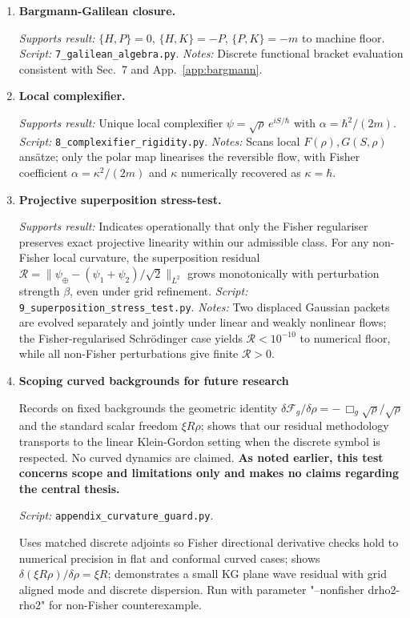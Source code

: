 \documentclass[11pt,a4paper]{article}
\numberwithin{equation}{section}
\theoremstyle{thmcompact}
\theoremstyle{remark}
\begin{document}
\begin{enumerate}[leftmargin=1.25em,label=\textbf{Test~\arabic*:},itemsep=1em]
		\item \textbf{Bargmann-Galilean closure.}
		
		\emph{Supports result:} $\{H,P\}=0$, $\{H,K\}=-P$, $\{P,K\}=-m$ to machine floor.
		\emph{Script:} \texttt{7\_galilean\_algebra.py}.
		\emph{Notes:} Discrete functional bracket evaluation consistent with Sec.~7 and App.~\ref{app:bargmann}.
		
\item \textbf{Local complexifier.}

\emph{Supports result:} Unique local complexifier $\psi=\sqrt{\rho}\,e^{iS/\hbar}$ with $\alpha=\hbar^{2}/(2m)$.
\emph{Script:} \texttt{8\_complexifier\_rigidity.py}.
\emph{Notes:} Scans local $F(\rho),G(S,\rho)$ ansätze; only the polar map linearises the reversible flow, with Fisher coefficient $\alpha=\kappa^{2}/(2m)$ and $\kappa$ numerically recovered as $\kappa=\hbar$.

		
		\item \textbf{Projective superposition stress-test.}
		
		\emph{Supports result:} Indicates operationally that only the Fisher regulariser preserves exact projective linearity within our admissible class. For any non-Fisher local curvature, the superposition residual $\mathcal{R}=\|\psi_\oplus-(\psi_1+\psi_2)/\sqrt2\|_{L^2}$ grows monotonically with perturbation strength $\beta$, even under grid refinement.
		\emph{Script:} \texttt{9\_superposition\_stress\_test.py}.
		\emph{Notes:} Two displaced Gaussian packets are evolved separately and jointly under linear and weakly nonlinear flows; the Fisher-regularised Schrödinger case yields $\mathcal{R}<10^{-10}$ to numerical floor, while all non-Fisher perturbations give finite $\mathcal{R}>0$. 
		
		\item \textbf{Scoping curved backgrounds for future research}

Records on fixed backgrounds the geometric identity \(\delta\mathcal F_g/\delta\rho=-\,\Box_g\sqrt{\rho}/\sqrt{\rho}\) and the standard scalar freedom \(\xi R\rho\); shows that our residual methodology transports to the linear Klein-Gordon setting when the discrete symbol is respected. No curved dynamics are claimed. \textbf{As noted earlier, this test concerns scope and limitations only and makes no claims regarding the central thesis.}
		
		\emph{Script:} \texttt{appendix\_curvature\_guard.py}.
		
		Uses matched discrete adjoints so Fisher directional derivative checks hold to numerical precision in flat and conformal curved cases; shows \(\delta(\xi R\rho)/\delta\rho=\xi R\); demonstrates a small KG plane wave residual with grid aligned mode and discrete dispersion. Run with parameter  "--nonfisher drho2-rho2" for non-Fisher counterexample.
		
	\end{enumerate}
	
\end{document}

